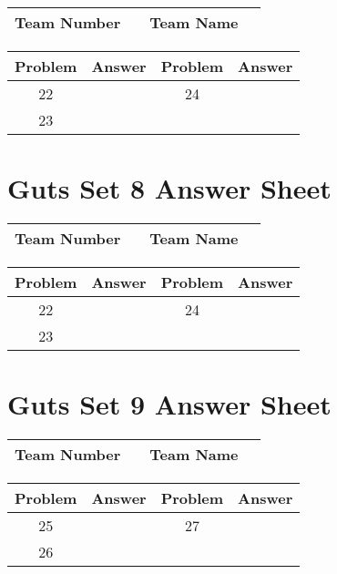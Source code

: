 \documentclass[14pt]{article}
\begin{document}
\begin{center}
\begin{tabular}{|r|r|r|r|}
\hline
	Team Number & \hspace{10em} &
	Team Name & \hspace{15em} \\ \hline
\end{tabular}
\end{center}
\begin{tabularx}{\textwidth}{|c|l|c|X|}\hline
	Problem & Answer & Problem & Answer \\\hline
	22 & \hspace{15em} & 24 & \\\hline
	23 & & & \\\hline
\end{tabularx}

\vspace{30px}

\section*{Guts Set 8 Answer Sheet}

\begin{center}
\begin{tabular}{|r|r|r|r|}
\hline
	Team Number & \hspace{10em} &
	Team Name & \hspace{15em} \\ \hline
\end{tabular}
\end{center}
\begin{tabularx}{\textwidth}{|c|l|c|X|}\hline
	Problem & Answer & Problem & Answer \\\hline
	22 & \hspace{15em} & 24 & \\\hline
	23 & & & \\\hline
\end{tabularx}

\section*{Guts Set 9 Answer Sheet}

\begin{center}
\begin{tabular}{|r|r|r|r|}
\hline
	Team Number & \hspace{10em} &
	Team Name & \hspace{15em} \\ \hline
\end{tabular}
\end{center}
\begin{tabularx}{\textwidth}{|c|l|c|X|}\hline
	Problem & Answer & Problem & Answer \\\hline
	25 & \hspace{15em} & 27 & \\\hline
	26 & & & \\\hline
\end{tabularx}
\end{document}
